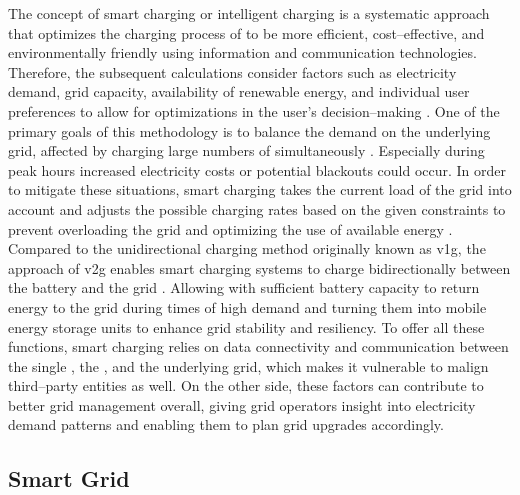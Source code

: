 The concept of smart charging or intelligent charging is a systematic approach that optimizes the charging process of  to be more efficient, cost--effective, and environmentally friendly using information and communication technologies. 
Therefore, the subsequent calculations consider factors such as electricity demand, grid capacity, availability of renewable energy, and individual user preferences to allow for optimizations in the user's decision--making \cite{deb_smart_2022}.
One of the primary goals of this methodology is to balance the demand on the underlying grid, affected by charging large numbers of  simultaneously \cite{daina_electric_2017}. Especially during peak hours increased electricity costs or potential blackouts could occur. 
In order to mitigate these situations, smart charging takes the current load of the grid into account and adjusts the possible charging rates based on the given constraints to prevent overloading the grid and optimizing the use of available energy \cite{garcia-villalobos_plug-electric_2014}. 
Compared to the unidirectional charging method originally known as \acrfull{v1g}, the approach of \acrfull{v2g} enables smart charging systems to charge bidirectionally between the  battery and the grid \cite[199]{kathiresh_e-mobility_2022}. Allowing  with sufficient battery capacity to return energy to the grid during times of high demand and turning them into mobile energy storage units to enhance grid stability and resiliency.
To offer all these functions, smart charging relies on data connectivity and communication between the single , the , and the underlying grid, which makes it vulnerable to malign third--party entities as well. On the other side, these factors can contribute to better grid management overall, giving grid operators insight into electricity demand patterns and enabling them to plan grid upgrades accordingly.

\subsection{Smart Grid}
\label{ch:Fundamentals:sec:Electric Mobility:ssec:Smart Grid}

